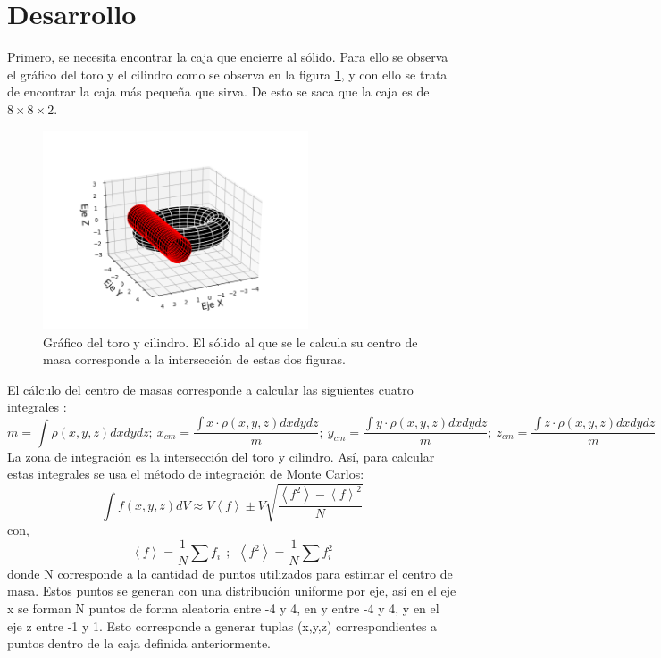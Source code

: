 \documentclass[letterpaper,oneside]{article}
\begin{document}
\section{Desarrollo}
Primero, se necesita encontrar la caja que encierre al sólido. Para ello se observa el gráfico del toro y el cilindro como se observa en la figura \ref{toro_cilindro }, y con ello se trata de encontrar la caja más pequeña que sirva. De esto se saca que la caja es de $8 \times 8 \times 2$.
\begin{figure}
    \centering    
    \includegraphics[width=0.7\textwidth]{Tarea 5/Grafico toro-cilindro.png}
    \caption{Gráfico del toro y cilindro. El sólido al que se le calcula su centro de  masa corresponde a la intersección de estas dos figuras.}
    \label{toro_cilindro }
\end{figure}{}
El cálculo del centro de masas corresponde a calcular las siguientes cuatro integrales :
$$ m = \int \rho(x,y,z)dxdydz;~ 
x_{cm} = \frac{\displaystyle \int x\cdot\rho(x,y,z)dxdydz}{m} ;~
y_{cm} = \frac{\displaystyle \int y\cdot\rho(x,y,z)dxdydz}{m} ;~
z_{cm} = \frac{\displaystyle \int z\cdot\rho(x,y,z)dxdydz}{m}$$
La zona de integración es la intersección del toro y cilindro. Así, para calcular estas integrales se usa el método de integración de Monte Carlos:
$$\int f(x,y,z) dV \approx V\left \langle f  \right  \rangle  \pm V  \sqrt{\frac{\left \langle f^2  \right \rangle -\left \langle f  \right  \rangle ^2}{N}} $$
con,
$$ \left \langle f \right \rangle = \frac{1}{N} \sum f_i~~;~~\left \langle f^2 \right \rangle = \frac{1}{N} \sum f_i^2 $$
donde N corresponde a la cantidad de puntos utilizados para estimar el centro de masa. Estos puntos se generan con una distribución uniforme por eje, así en el eje x se forman N puntos de forma aleatoria entre -4 y 4, en y entre -4 y 4, y en el eje z entre -1 y 1. Esto corresponde a generar tuplas (x,y,z) correspondientes a puntos dentro de la caja definida anteriormente. \\
\end{document}
